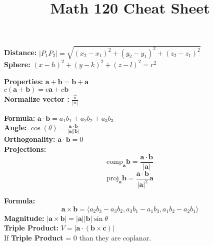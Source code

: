 \documentclass[2pt]{article}
\title{\small \textbf{Math 120 Cheat Sheet}} %
\date{} %
\begin{document}
\maketitle
\vspace{-10pt} %
\begin{multicols}{2}

\begin{tcolorbox}[title=\textbf{3D Coordinate Systems}, colframe=lightblue]
\textbf{Distance:} $|P_1P_2| = \sqrt{(x_2 - x_1)^2 + (y_2 - y_1)^2 + (z_2 - z_1)^2}$ \\
\textbf{Sphere:} $(x-h)^2 + (y-k)^2 + (z-l)^2 = r^2$
\end{tcolorbox}

\begin{tcolorbox}[title=\textbf{Vectors}, colframe=lightgreen]
\textbf{Properties:} $\mathbf{a} + \mathbf{b} = \mathbf{b} + \mathbf{a}$ \\
$c(\mathbf{a} + \mathbf{b}) = c\mathbf{a} + c\mathbf{b}$ \\
\textbf{Normalize vector :} $\frac{\vec{n}}{|n|} $ \\

\end{tcolorbox}

\begin{tcolorbox}[title=\textbf{Dot Product}, colframe=lightpink]
    \textbf{Formula:} $\mathbf{a} \cdot \mathbf{b} = a_1b_1 + a_2b_2 + a_3b_3$ \\
    \textbf{Angle:} $\cos(\theta) = \frac{\mathbf{a} \cdot \mathbf{b}}{|\mathbf{a}| |\mathbf{b}|}$ \\
    \textbf{Orthogonality:} $\mathbf{a} \cdot \mathbf{b} = 0$ \\
    \textbf{Projections:} 
    \[ \text{comp}_{\mathbf{a}} \mathbf{b} = \frac{\mathbf{a} \cdot \mathbf{b}}{|\mathbf{a}|} \] 
    \[ \text{proj}_{\mathbf{a}} \mathbf{b} = \frac{\mathbf{a} \cdot \mathbf{b}}{|\mathbf{a}|^2} \mathbf{a} \] 
\end{tcolorbox}

\begin{tcolorbox}[title=\textbf{Cross Product}, colframe=lightyellow]
\textbf{Formula:}
\[ \mathbf{a} \times \mathbf{b} = \langle a_2b_3 - a_3b_2, a_3b_1 - a_1b_3, a_1b_2 - a_2b_1 \rangle \] 
\textbf{Magnitude:} $|\mathbf{a} \times \mathbf{b}| = |\mathbf{a}| |\mathbf{b}| \sin \theta$ \\
\textbf{Triple Product:} $V = |\mathbf{a} \cdot (\mathbf{b} \times \mathbf{c})|$ \\
If \textbf{Triple Product} = 0 than they are coplanar. 
\end{tcolorbox}


\end{multicols}
\end{document}
